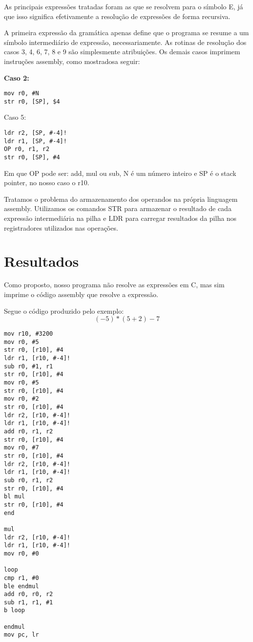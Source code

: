 \documentclass[a4paper, 11pt]{article}
\begin{document}
\begin{multicols*}{2}
As principais expressões tratadas foram as que se resolvem para o símbolo E, já que isso significa efetivamente a resolução de expressões de forma recursiva.

A primeira expressão da gramática apenas define que o programa se resume a um símbolo intermediário de expressão, necessariamente. As rotinas de resolução dos casos 3, 4, 6, 7, 8 e 9 são simplesmente atribuições. Os demais casos imprimem instruções assembly, como mostradosa seguir:

\begin{multicols*}{2}
\bf Caso 2:
\begin{verbatim}
mov r0, #N
str r0, [SP], $4
\end{verbatim}

\break
\vfill

Caso 5:
\begin{verbatim}
ldr r2, [SP, #-4]!
ldr r1, [SP, #-4]!
OP r0, r1, r2
str r0, [SP], #4
\end{verbatim}

\end{multicols*}

Em que OP pode ser: add, mul ou sub, N é um número inteiro e SP é o stack pointer, no nosso caso o r10.

Tratamos o problema do armazenamento dos operandos na própria linguagem assembly. Utilizamos os comandos STR para armazenar o resultado de cada expressão intermediária na pilha e LDR para carregar resultados da pilha nos registradores utilizados nas operações.

\section*{Resultados}

Como proposto, nosso programa não resolve as expressões em C, mas sim imprime o código assembly que resolve a expressão.

Segue o código produzido pelo exemplo: $$(-5)*(5 + 2) - 7$$

\begin{multicols*}{2}

\begin{verbatim}
mov r10, #3200
mov r0, #5
str r0, [r10], #4
ldr r1, [r10, #-4]!
sub r0, #1, r1
str r0, [r10], #4
mov r0, #5
str r0, [r10], #4
mov r0, #2
str r0, [r10], #4
ldr r2, [r10, #-4]!
ldr r1, [r10, #-4]!
add r0, r1, r2
str r0, [r10], #4
mov r0, #7
str r0, [r10], #4
ldr r2, [r10, #-4]!
ldr r1, [r10, #-4]!
sub r0, r1, r2
str r0, [r10], #4
bl mul
str r0, [r10], #4
end

mul
ldr r2, [r10, #-4]!
ldr r1, [r10, #-4]!
mov r0, #0

loop
cmp r1, #0
ble endmul
add r0, r0, r2
sub r1, r1, #1
b loop

endmul
mov pc, lr

\end{verbatim}

\end{multicols*}

\end{multicols*}
\end{document}
